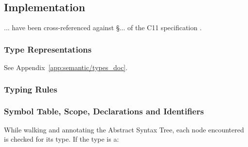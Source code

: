 \subsection{Implementation}
... have been cross-referenced against §... of the C11 specification \cite{c11_spec}.

\subsubsection{Type Representations}

See Appendix~\ref{app:semantic/types_doc}.

\subsubsection{Typing Rules}

\subsubsection{Symbol Table, Scope, Declarations and Identifiers}

While walking and annotating the Abstract Syntax Tree, each node encountered is checked for its type. If the type is a:

